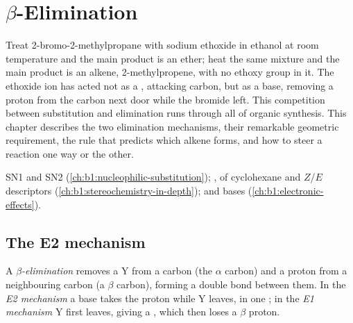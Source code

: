 \chapter{\texorpdfstring{$\beta$}{Beta}-Elimination}\label{ch:b1:elimination}

Treat 2-bromo-2-methylpropane with sodium ethoxide in ethanol at room
temperature and the main product is an ether; heat the same mixture and
the main product is an alkene, 2-methylpropene, with no ethoxy group in
it. The ethoxide ion has acted not as a , attacking carbon, but
as a base, removing a proton from the carbon next door while the bromide
left. This competition between substitution and elimination runs through
all of organic synthesis. This chapter describes the two elimination
mechanisms, their remarkable geometric requirement, the rule that
predicts which alkene forms, and how to steer a reaction one way or the
other.

\begin{recall}
SN1 and SN2 (\cref{ch:b1:nucleophilic-substitution}); ,
 of cyclohexane and $Z$/$E$ descriptors
(\cref{ch:b1:stereochemistry-in-depth});  and bases
(\cref{ch:b1:electronic-effects}).
\end{recall}

\section{The E2 mechanism}

\begin{definition}\label{def:b1:elimination:elimination}
A \emph{$\beta$-elimination} removes a
 Y from a carbon (the $\alpha$ carbon) and a proton from a
neighbouring carbon (a $\beta$ carbon), forming a double bond between
them. In the \emph{E2 mechanism} a base takes the
proton while Y leaves, in one ; in the \emph{E1
mechanism} Y first leaves, giving a , which
then loses a $\beta$ proton.
\end{definition}

